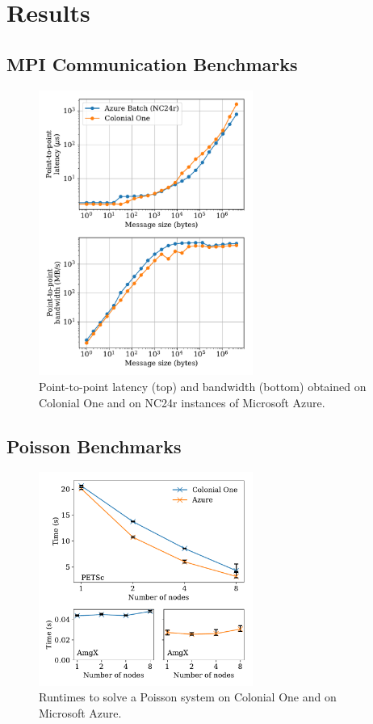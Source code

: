 \documentclass[10pt,journal,compsoc]{IEEEtran}
\begin{document}
\section{Results}\label{sec:results}

\subsection{MPI Communication Benchmarks}\label{subsec:mpi_benchmarks}

\begin{figure}[!ht]
    \centering
    \includegraphics[width=7cm]{figures/osu_latency_bandwidth.pdf}
    \caption{Point-to-point latency (top) and bandwidth (bottom) obtained on Colonial One and on NC24r instances of Microsoft Azure.}
    \label{fig:osu_benchmarks}
\end{figure}

\subsection{Poisson Benchmarks}\label{subsec:poisson_benchmarks}

\begin{figure}[!ht]
    \centering
    \includegraphics[width=7cm]{figures/poisson_time_vs_nodes.pdf}
    \caption{Runtimes to solve a Poisson system on Colonial One and on Microsoft Azure.}
    \label{fig:poisson_benchmarks}
\end{figure}
\end{document}
